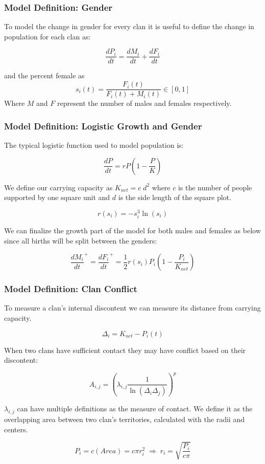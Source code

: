 \documentclass[t]{beamer}
\begin{document}
\begin{frame}
\frametitle{Model Definition: Gender}
To model the change in gender for every clan it is useful to define the change in population for each clan as:

$$ \frac{dP_i}{dt} = \frac{dM_i}{dt} + \frac{dF_i}{dt} $$

and the percent female as 
$$s_i(t) = \frac{F_i(t)}{F_i(t) + M_i(t)} \in \left[0,1\right]$$
Where $M$ and $F$ represent the number of males and females respectively.

\end{frame}

\begin{frame}
\frametitle{Model Definition: Logistic Growth and Gender}

The typical logistic function used to model population is:

$$\dfrac{dP}{dt} = rP\left(1 - \dfrac{P}{K}\right)$$

We define our carrying capacity as $K_{net} = c\;d^2$ where $c$ is the number of people supported by one square unit and $d$ is the side length of the square plot.

$$ r(s_i) = -s_i^3 \ln{(s_i)} $$


We can finalize the growth part of the model for both males and females as below since all births will be split between the genders:

$$ \frac{dM_i}{dt}^{+} = \frac{dF_i}{dt}^{+} = \frac{1}{2}r(s_i)P_i\left(1 - \frac{P_i}{K_{net}}\right)$$


\end{frame}

\begin{frame}
\frametitle{Model Definition: Clan Conflict}
To measure a clan's internal discontent we can measure its distance from carrying capacity.

$$\Delta_i = K_{net} - P_i(t)$$

When two clans have sufficient contact they may have conflict based on their discontent:

$$A_{i, j} = \left(\lambda_{i, j}\frac{1}{\ln(\Delta_i\Delta_j)}\right)^p$$

$\lambda_{i, j}$ can have multiple definitions as the measure of contact. We define it as the overlapping area between two clan's territories, calculated with the radii and centers.

$$P_i = c(Area) = c \pi r_i^2 \; \Rightarrow \; r_i = \sqrt{\dfrac{P_i}{c\pi}}$$

\end{frame}
\end{document}

